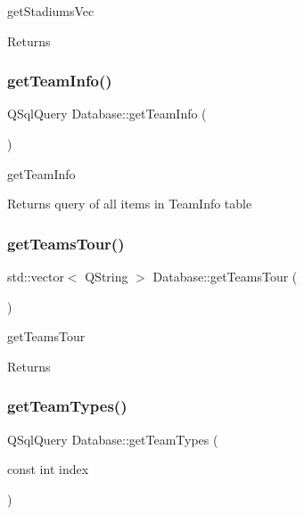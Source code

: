 get\+Stadiums\+Vec 

\begin{DoxyReturn}{Returns}

\end{DoxyReturn}
\mbox{\label{class_database_a7d66de82867475afd95ba8a29fc694fe}} 
\subsubsection{\texorpdfstring{get\+Team\+Info()}{getTeamInfo()}}
{\footnotesize\ttfamily Q\+Sql\+Query Database\+::get\+Team\+Info (\begin{DoxyParamCaption}{ }\end{DoxyParamCaption})}



get\+Team\+Info 

\begin{DoxyReturn}{Returns}
query of all items in Team\+Info table 
\end{DoxyReturn}
\mbox{\label{class_database_a58d31282aed93e50be29a8a447fd100e}} 
\subsubsection{\texorpdfstring{get\+Teams\+Tour()}{getTeamsTour()}}
{\footnotesize\ttfamily std\+::vector$<$ Q\+String $>$ Database\+::get\+Teams\+Tour (\begin{DoxyParamCaption}{ }\end{DoxyParamCaption})}



get\+Teams\+Tour 

\begin{DoxyReturn}{Returns}

\end{DoxyReturn}
\mbox{\label{class_database_ae4b6ca4c6d269b46fcbf186ecdfc3f80}} 
\subsubsection{\texorpdfstring{get\+Team\+Types()}{getTeamTypes()}}
{\footnotesize\ttfamily Q\+Sql\+Query Database\+::get\+Team\+Types (\begin{DoxyParamCaption}\item[{const int}]{index }\end{DoxyParamCaption})}



